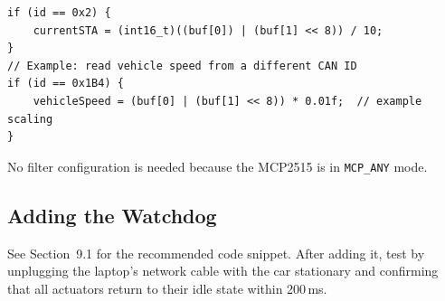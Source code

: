 \documentclass[12pt, letterpaper]{article}
\begin{document}
\begin{lstlisting}[style=cpp]
if (id == 0x2) {
    currentSTA = (int16_t)((buf[0]) | (buf[1] << 8)) / 10;
}
// Example: read vehicle speed from a different CAN ID
if (id == 0x1B4) {
    vehicleSpeed = (buf[0] | (buf[1] << 8)) * 0.01f;  // example scaling
}
\end{lstlisting}

No filter configuration is needed because the MCP2515 is in \texttt{MCP\_ANY}
mode.

\subsection{Adding the Watchdog}

See Section~9.1 for the recommended code snippet.  After adding it, test by
unplugging the laptop's network cable with the car stationary and confirming
that all actuators return to their idle state within 200\,ms.
\end{document}
